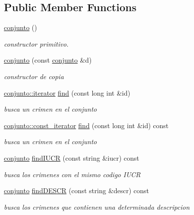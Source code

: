 \subsection*{Public Member Functions}
\begin{DoxyCompactItemize}
\item 
\hyperlink{classconjunto_a16d987f42c679efab01748178ba45891}{conjunto} ()
\begin{DoxyCompactList}\small\item\em constructor primitivo. \end{DoxyCompactList}\item 
\hyperlink{classconjunto_ab0944b1f9a0c959ca314ce0debd5def9}{conjunto} (const \hyperlink{classconjunto}{conjunto} \&d)
\begin{DoxyCompactList}\small\item\em constructor de copia \end{DoxyCompactList}\item 
\hyperlink{classconjunto_1_1iterator}{conjunto\+::iterator} \hyperlink{classconjunto_a64d02e56b460a58d596f986c055f0a2e}{find} (const long int \&id)
\begin{DoxyCompactList}\small\item\em busca un crimen en el conjunto \end{DoxyCompactList}\item 
\hyperlink{classconjunto_1_1const__iterator}{conjunto\+::const\+\_\+iterator} \hyperlink{classconjunto_a356285fe75238fd67673eba9c6bf6d24}{find} (const long int \&id) const 
\begin{DoxyCompactList}\small\item\em busca un crimen en el conjunto \end{DoxyCompactList}\item 
\hyperlink{classconjunto}{conjunto} \hyperlink{classconjunto_a2ca2a7b59bce8369e9d9ccc1c7be9614}{find\+I\+U\+C\+R} (const string \&iucr) const 
\begin{DoxyCompactList}\small\item\em busca los crimenes con el mismo codigo I\+U\+C\+R \end{DoxyCompactList}\item 
\hyperlink{classconjunto}{conjunto} \hyperlink{classconjunto_afff3e7f4b3d00f422dd7ab2fec935378}{find\+D\+E\+S\+C\+R} (const string \&descr) const 
\begin{DoxyCompactList}\small\item\em busca los crimenes que contienen una determinada descripcion \end{DoxyCompactList}\item 

\end{DoxyCompactItemize}
